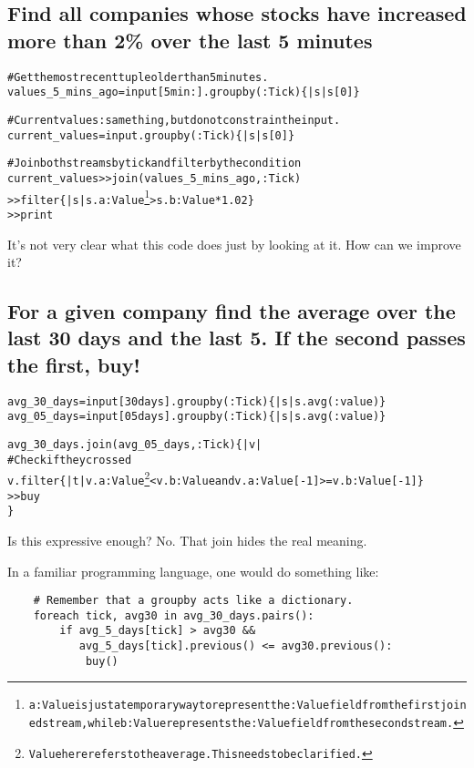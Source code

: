 \documentclass[twoside]{report}
\begin{document}
\subsection{Find all companies whose stocks have increased more than 2\% over the last 5 minutes}
\begin{alltt}
# Get the most recent tuple older than 5 minutes.
values_5_mins_ago = input[5min:].groupby(:Tick) \{ |s| s[0] \}

# Current values: same thing, but do not constrain the input.
current_values    = input.groupby(:Tick) \{ |s| s[0] \}

# Join both streams by tick and filter by the condition
current_values >> join(values_5_mins_ago, :Tick)
               >> filter \{ |s| s.a:Value\footnote{a:Value is just a temporary way to represent the :Value field from the first joined stream, while b:Value represents the :Value field from the second stream.} > s.b:Value * 1.02 \}
               >> print

\end{alltt}

It's not very clear what this code does just by looking at it. How can we improve it?


\subsection{For a given company find the average over the last 30 days and the last 5. If the second passes the first, buy!}

\begin{alltt}
avg_30_days = input[30days].groupby(:Tick) \{ |s| s.avg(:value) \}
avg_05_days = input[05days].groupby(:Tick) \{ |s| s.avg(:value) \}

avg_30_days.join(avg_05_days, :Tick) \{ |v|
    # Check if they crossed
    v.filter \{ |t| v.a:Value\footnote{Value here refers to the average. This needs to be clarified.} < v.b:Value and v.a:Value[-1] >= v.b:Value[-1] \}
        >> buy
\}

\end{alltt}

Is this expressive enough? No. That join hides the real meaning.

In a familiar programming language, one would do something like:

\begin{verbatim}
    # Remember that a groupby acts like a dictionary.
    foreach tick, avg30 in avg_30_days.pairs():
        if avg_5_days[tick] > avg30 &&
           avg_5_days[tick].previous() <= avg30.previous():
            buy()
\end{verbatim}
\end{document}
